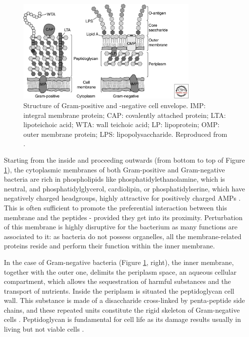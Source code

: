 \begin{figure}[t!]
\begin{center}
\includegraphics[width = 0.8\textwidth]{1introduction/pics/bacterial_membrane.jpg}
\caption[Structure of Gram-positive and Gram-negative cell envelope.]{Structure of Gram-positive and -negative cell envelope. IMP: integral membrane protein; CAP: covalently attached protein; LTA: lipoteichoic acid; WTA: wall teichoic acid; LP: lipoprotein; OMP: outer membrane protein; LPS: lipopolysaccharide. Reproduced from \citet{Silhavy2010}.} \label{fig:membranes}
\end{center}
\end{figure}

Starting from the inside and proceeding outwards (from bottom to top of Figure \ref{fig:membranes}), the cytoplasmic membranes of both Gram-positive and Gram-negative bacteria are rich in phospholipids like phosphatidylethanolamine, which is neutral, and phosphatidylglycerol, cardiolipin, or phosphatidylserine, which have negatively charged headgroups, highly attractive for positively charged AMPs \citep{Silhavy2010,Lin2016}. This is often sufficient to promote the preferential interaction between this membrane and the peptides - provided they get into its proximity.
%
Perturbation of this membrane is highly disruptive for the bacterium as many functions are associated to it: as bacteria do not possess organelles, all the membrane-related proteins reside and perform their function within the inner membrane.

In the case of Gram-negative bacteria (Figure \ref{fig:membranes}, right), the inner membrane, together with the outer one, delimits the periplasm space, an aqueous cellular compartment, which allows the sequestration of harmful substances and the transport of nutrients.
%
Inside the periplasm is situated the peptidoglycan cell wall. This substance is made of a disaccharide cross-linked by penta-peptide side chains, and these repeated units constitute the rigid skeleton of Gram-negative cells \citep{Gan2008}. Peptidoglycan is fundamental for cell life as its damage results usually in living but not viable cells \citep{Joseleau-Petit2007}.

